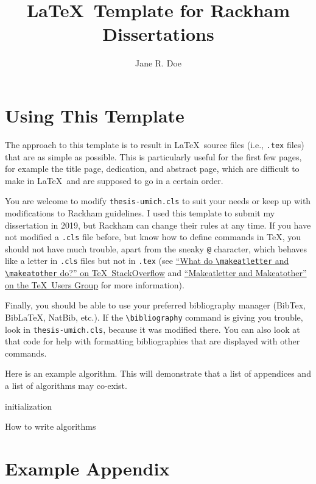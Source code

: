 \documentclass[thesis]{thesis-umich}
\title{\LaTeX\ Template for Rackham Dissertations}
\author{Jane R. Doe}
\begin{document}
\chapter{Using This Template}
The approach to this template is to result in \LaTeX~source files (i.e.,
\texttt{.tex} files) that are as simple as possible.  This is particularly
useful for the first few pages, for example the title page, dedication, and
abstract page, which are difficult to make in \LaTeX~and are supposed to go in
a certain order.

You are welcome to modify \texttt{thesis-umich.cls} to suit your needs or keep
up with modifications to Rackham guidelines. I used this template to submit my
dissertation in 2019, but Rackham can change their rules at any time. If you
have not modified a \texttt{.cls} file before, but know how to define commands
in \TeX, you should not have much trouble, apart from the sneaky \verb=@=
character, which behaves like a letter in \texttt{.cls} files but not in
\texttt{.tex} (see \href{https://tex.stackexchange.com/q/8351/21027}{``What do
  \texttt{\textbackslash makeatletter} and \texttt{\textbackslash makeatother}
do?'' on \TeX\ StackOverflow} and
\href{https://tug.org/pipermail/tugindia/2002-January/000178.html}{``Makeatletter
and Makeatother'' on the \TeX\ Users Group} for more information).

Finally, you should be able to use your preferred bibliography manager (BibTex, BibLaTeX, NatBib, etc.). If the \texttt{\textbackslash bibliography} command is giving you trouble, look in \texttt{thesis-umich.cls}, because it was modified there. You can also look at that code for help with formatting bibliographies that are displayed with other commands.


Here is an example algorithm. This will demonstrate that a list of appendices and a list of algorithms may co-exist.

\begin{algorithm}[H]
  \SetAlgoLined
   initialization\;
   \caption{How to write algorithms}
  \end{algorithm}


\appendix
\chapter{Example Appendix}
\end{document}

